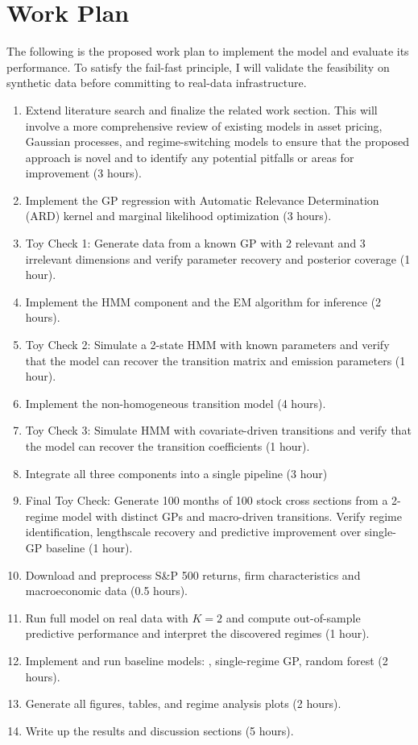 \documentclass[11pt]{article}
\begin{document}
\section{Work Plan}
The following is the  proposed work plan to implement the model and evaluate its performance. To satisfy the fail-fast principle, I will validate the feasibility on synthetic data before committing to real-data infrastructure.
\begin{enumerate}
    \item Extend literature search and finalize the related work section. This will involve a more comprehensive review of existing models in asset pricing, Gaussian processes, and regime-switching models to ensure that the proposed approach is novel and to identify any potential pitfalls or areas for improvement (3 hours).
    \item Implement the GP regression with Automatic Relevance Determination (ARD) kernel and marginal likelihood optimization (3 hours).
    \item Toy Check 1: Generate data from a known GP with 2 relevant and 3 irrelevant dimensions and verify parameter recovery and posterior coverage (1 hour).
    \item Implement the HMM component and the EM algorithm for inference (2 hours).
    \item Toy Check 2: Simulate a 2-state HMM with known parameters and verify that the model can recover the transition matrix and emission parameters (1 hour).
    \item Implement the non-homogeneous transition model (4 hours).
    \item Toy Check 3: Simulate HMM with covariate-driven transitions and verify that the model can recover the transition coefficients (1 hour).
    \item Integrate all three components into a single pipeline (3 hour)
    \item Final Toy Check: Generate 100 months of 100 stock cross sections from a 2-regime model with distinct GPs and macro-driven transitions. Verify regime identification, lengthscale recovery and predictive improvement over single-GP baseline (1 hour).
    \item Download and preprocess S\&P 500 returns, firm characteristics and macroeconomic data (0.5 hours).
    \item Run full model on real data with $K=2$ and compute out-of-sample predictive performance and interpret the discovered regimes (1 hour).
    \item Implement and run baseline models: \cite{fama_risk_1973}, single-regime GP, random forest (2 hours).
    \item Generate all figures, tables, and regime analysis plots (2 hours).
    \item Write up the results and discussion sections (5 hours).
\end{enumerate}
\end{document}

